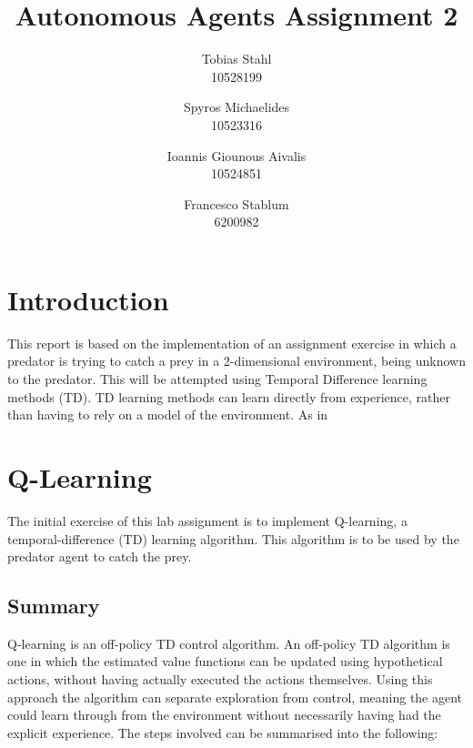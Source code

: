 \documentclass[11pt]{article}
\title{
	\textbf{Autonomous Agents Assignment 2}
}
\author{Tobias Stahl \\ 10528199 \and Spyros Michaelides \\ 10523316 \and Ioannis Giounous Aivalis \\ 10524851 \and Francesco Stablum \\ 6200982}
\begin{document}
\maketitle




\section{Introduction}
This report is based on the implementation of an assignment exercise in which a predator is trying to catch a prey in a 2-dimensional environment, being unknown to the predator. This will be attempted  using Temporal Difference learning methods (TD). TD learning methods can learn directly from experience, rather than having to rely on a model of the environment. As in 


\section{Q-Learning}
The initial exercise of this lab assignment is to implement Q-learning, a temporal-difference (TD) learning algorithm. This algorithm is to be used by the predator agent to catch the prey.



\subsection{Summary}
Q-learning is an off-policy TD control algorithm. An off-policy TD algorithm is one in which the estimated value functions can be updated using hypothetical actions, without having actually executed the actions themselves. Using this approach the algorithm can separate exploration from control, meaning the agent could learn through from the environment without necessarily having had the explicit experience.
The steps involved can be summarised into the following:\\\\

\pagebreak
\end{document}
